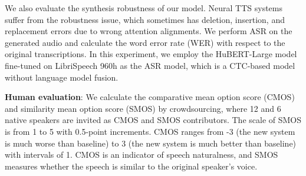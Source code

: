 \documentclass{article}
\theoremstyle{plain}
\theoremstyle{definition}
\theoremstyle{remark}
\begin{document}
We also evaluate the synthesis robustness of our model. Neural TTS systems suffer from the robustness issue, which sometimes has deletion, insertion, and replacement errors due to wrong attention alignments.  We perform ASR on the generated audio and calculate the word error rate (WER) with respect to the original transcriptions. In this experiment, we employ the HuBERT-Large \citep{hsu2021hubert} model fine-tuned on LibriSpeech 960h as the ASR model, which is a CTC-based model without language model fusion. 

 \textbf{Human evaluation}: We calculate the comparative mean option score (CMOS) and similarity mean option score (SMOS)  by  crowdsourcing, where 12 and 6 native speakers are invited as CMOS and SMOS contributors. The scale of SMOS is from 1 to 5 with 0.5-point increments.  CMOS ranges from -3 (the new system is
much worse than baseline) to 3 (the new system is much better than
baseline) with intervals of 1.
CMOS is an indicator of speech naturalness, and SMOS measures whether the speech is similar to the original speaker's voice. 

 
\end{document}
